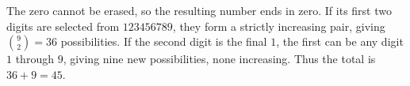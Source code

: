 The zero cannot be erased, so the resulting number ends in zero. If its first two digits are selected from $123456789$, they form a strictly increasing pair, giving $\binom92=36$ possibilities. If the second digit is the final $1$, the first can be any digit $1$ through $9$, giving nine new possibilities, none increasing. Thus the total is $36+9=\boxed{45}$.
